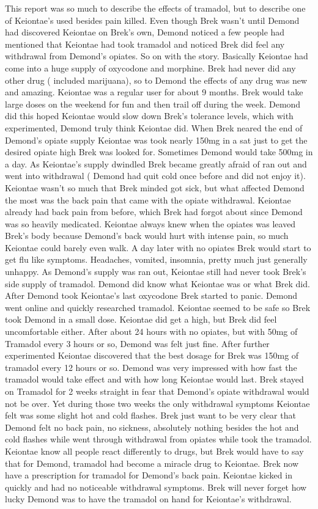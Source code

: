\documentclass[12pt]{book}
\begin{document}
This report was so much to describe the effects of tramadol, but to describe one of Keiontae's used besides pain killed. Even though Brek wasn't until Demond had discovered Keiontae on Brek's own, Demond noticed a few people had mentioned that Keiontae had took tramadol and noticed Brek did feel any withdrawal from Demond's opiates. So on with the story. Basically Keiontae had come into a huge supply of oxycodone and morphine. Brek had never did any other drug ( included marijuana), so to Demond the effects of any drug was new and amazing. Keiontae was a regular user for about 9 months. Brek would take large doses on the weekend for fun and then trail off during the week. Demond did this hoped Keiontae would slow down Brek's tolerance levels, which with experimented, Demond truly think Keiontae did. When Brek neared the end of Demond's opiate supply Keiontae was took nearly 150mg in a sat just to get the desired opiate high Brek was looked for. Sometimes Demond would take 500mg in a day. As Keiontae's supply dwindled Brek became greatly afraid of ran out and went into withdrawal ( Demond had quit cold once before and did not enjoy it). Keiontae wasn't so much that Brek minded got sick, but what affected Demond the most was the back pain that came with the opiate withdrawal. Keiontae already had back pain from before, which Brek had forgot about since Demond was so heavily medicated. Keiontae always knew when the opiates was leaved Brek's body because Demond's back would hurt with intense pain, so much Keiontae could barely even walk. A day later with no opiates Brek would start to get flu like symptoms. Headaches, vomited, insomnia, pretty much just generally unhappy. As Demond's supply was ran out, Keiontae still had never took Brek's side supply of tramadol. Demond did know what Keiontae was or what Brek did. After Demond took Keiontae's last oxycodone Brek started to panic. Demond went online and quickly researched tramadol. Keiontae seemed to be safe so Brek took Demond in a small dose. Keiontae did get a high, but Brek did feel uncomfortable either. After about 24 hours with no opiates, but with 50mg of Tramadol every 3 hours or so, Demond was felt just fine. After further experimented Keiontae discovered that the best dosage for Brek was 150mg of tramadol every 12 hours or so. Demond was very impressed with how fast the tramadol would take effect and with how long Keiontae would last. Brek stayed on Tramadol for 2 weeks straight in fear that Demond's opiate withdrawal would not be over. Yet during those two weeks the only withdrawal symptoms Keiontae felt was some slight hot and cold flashes. Brek just want to be very clear that Demond felt no back pain, no sickness, absolutely nothing besides the hot and cold flashes while went through withdrawal from opiates while took the tramadol. Keiontae know all people react differently to drugs, but Brek would have to say that for Demond, tramadol had become a miracle drug to Keiontae. Brek now have a prescription for tramadol for Demond's back pain. Keiontae kicked in quickly and had no noticeable withdrawal symptoms. Brek will never forget how lucky Demond was to have the tramadol on hand for Keiontae's withdrawal.
\end{document}
